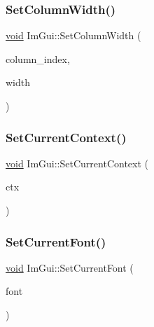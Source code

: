 \subsubsection{\texorpdfstring{Set\+Column\+Width()}{SetColumnWidth()}}
{\footnotesize\ttfamily \hyperlink{imgui__impl__opengl3__loader_8h_ac668e7cffd9e2e9cfee428b9b2f34fa7}{void} Im\+Gui\+::\+Set\+Column\+Width (\begin{DoxyParamCaption}\item[{int}]{column\+\_\+index,  }\item[{float}]{width }\end{DoxyParamCaption})}

\mbox{\label{namespaceImGui_a289dbbbffdadcf1231821d97a7c4a9be}} 
\subsubsection{\texorpdfstring{Set\+Current\+Context()}{SetCurrentContext()}}
{\footnotesize\ttfamily \hyperlink{imgui__impl__opengl3__loader_8h_ac668e7cffd9e2e9cfee428b9b2f34fa7}{void} Im\+Gui\+::\+Set\+Current\+Context (\begin{DoxyParamCaption}\item[{\hyperlink{structImGuiContext}{Im\+Gui\+Context} $\ast$}]{ctx }\end{DoxyParamCaption})}

\mbox{\label{namespaceImGui_a4f83c0a884e07247a00700d3dd3d01e3}} 
\subsubsection{\texorpdfstring{Set\+Current\+Font()}{SetCurrentFont()}}
{\footnotesize\ttfamily \hyperlink{imgui__impl__opengl3__loader_8h_ac668e7cffd9e2e9cfee428b9b2f34fa7}{void} Im\+Gui\+::\+Set\+Current\+Font (\begin{DoxyParamCaption}\item[{\hyperlink{structImFont}{Im\+Font} $\ast$}]{font }\end{DoxyParamCaption})}

\mbox{\label{namespaceImGui_a51ea13c986360d8a2e868dc9eeac2115}} 
